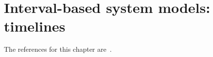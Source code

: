 \chapter{Interval-based system models: timelines}\label{chap:Timelines}
\begin{chapref}
The references for this chapter are~\cite{kr18,gand18,ictcs18}.
\end{chapref}

\minitoc\mtcskip

\newcommand{\Instruct}{\mathsf{Inst}}
\newcommand{\InstructLab}{\mathsf{InstLab}}
\newcommand{\InstL}{\mathsf{L}}
\newcommand{\Inc}{\mathsf{Inc}}
\newcommand{\Dec}{\mathsf{Dec}}
\newcommand{\halt}{{\textit{halt}}}
\newcommand{\init}{{\textit{init}}}
\newcommand{\main}{{\textit{main}}}
\newcommand{\Checking}{{\textit{check}}}
\newcommand{\inc}{{\mathsf{inc}}}
\newcommand{\dec}{{\mathsf{dec}}}

\newcommand{\zero}{{\mathsf{zero}}}
\newcommand{\instr}{{\textit{op}}}
\newcommand{\gainy}{{\textit{gainy}}}
\newcommand{\From}{{\textit{from}}}
\newcommand{\To}{{\textit{to}}}
\newcommand{\cont}{{\textit{sec}}}
\newcommand{\Tag}{{\textit{Tag}}}
\newcommand{\Succ}{{\textit{succ}}}
\newcommand{\op}{{\textit{op}}}

\newcommand{\dummy}{{\textit{dummy}}}

\newcommand{\Con}{\mathsf{con}}


\newcommand{\start}{\mathsf{s}}
\newcommand{\startTime}{\mathsf{s}}
\newcommand{\Ending}{\mathsf{e}}


\newcommand{\der}[1]{\ensuremath{\;\;{\mathop{{ %
            \longrightarrow}}\limits^{{#1}}}\!}\;\;} %

\newcommand{\derG}[1]{\ensuremath{\;\;{\mathop{{ %
            \longrightarrow}}\limits^{{#1}}}\!}_\gainy\;\;} %


\newcommand{\TA}{\text{\sffamily TA}}
\newcommand{\MTL}{\text{\sffamily MTL}}
\newcommand{\TPTL}{\text{\sffamily TPTL}}
\newcommand{\MITL}{\text{\sffamily MITL}}
\newcommand{\MITLR}{\text{\sffamily MITL}_{(0,\infty)}}

\newcommand{\RealP}{{\mathbb{R}_+}}
\newcommand{\RatP}{{\mathbb{Q}_+}}
\newcommand{\val}{{\mathit{val}}}
\newcommand{\Main}{{\mathit{Main}}}
\newcommand{\EqTime}{{\mathit{EqTime}}}
\newcommand{\Past}{{\mathit{past}}}
\newcommand{\code}{{\mathit{code}}}
\newcommand{\Res}{\textit{Res}}
\newcommand{\TLang}{{\mathcal{L}_T}}
\newcommand{\StrictUntil}{\textsf{U}}

\newcommand{\Deriv}{{\mathit{Deriv}}}
\newcommand{\Intv}{{\mathit{Intv}}}
\newcommand{\IntvR}{{\mathit{Intv}_{(0,\infty)}}}










